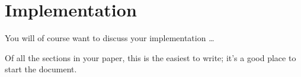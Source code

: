 
\section{Implementation}
\label{sec:Implementation}

You will of course want to discuss your implementation \dots

Of all the sections in your paper, this is the easiest to write; it's a good place to start the document.